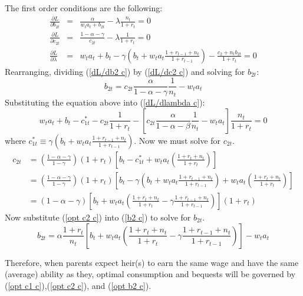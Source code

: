 \documentclass{article}
\begin{document}
The first order conditions are the following:
\begin{eqnarray}
\frac{\partial L}{\partial b_{2t}} &=& \frac{\alpha}{w_t a_t + b_{2t}} - \lambda \frac{n_t}{1+r_t} = 0\label{dL/db2 c}\\
\frac{\partial L}{\partial c_{2t}} &=& \frac{1-\alpha-\gamma}{c_{2t}}-\lambda\frac{1}{1+r_t} = 0\label{dL/dc2 c}\\
\frac{\partial L}{\partial \lambda} &=& w_t a_t + b_t - \gamma(b_t+w_t a_t \frac{1+r_{t-1}+n_t}{1+r_{t-1}} ) - \frac{c_{2} + n_t b_{2t}}{1+r_t} = 0\label{dL/dlambda c}
\end{eqnarray}
Rearranging, dividing (\ref{dL/db2 c}) by (\ref{dL/dc2 c}) and solving for $b_{2t}$:
\begin{equation}\label{b2 c}
b_{2t} = c_{2t}\frac{\alpha}{1-\alpha-\gamma}\frac{1}{n_t}-w_t a_t
\end{equation}
Substituting the equation above into (\ref{dL/dlambda c}):
\begin{equation}
w_t a_t + b_t - c^{*}_{1t} - c_{2t}\frac{1}{1+r_t} - [c_{2t}\frac{\alpha}{1-\alpha-\beta}\frac{1}{n_t}-w_t a_t]\frac{n_t}{1+r_t} = 0
\end{equation}
where $c^{*}_{1t} \equiv \gamma(b_t + w_t a_t\frac{1+r_{t-1}+n_t}{1+r_{t-1}} )$.  Now we must solve for $c_{2t}$.
\begin{equation}\label{opt c2 c}
\begin{split}
c_{2t}
&= (\frac{1-\alpha-\gamma}{1-\gamma})(1+r_t)[ b_t-c^{*}_{1t} + w_t a_t (\frac{1+r_t+n_t}{1+r_t}) ]\\
&= (\frac{1-\alpha-\gamma}{1-\gamma})(1+r_t)[ b_t-\gamma(b_t + w_t a_t\frac{1+r_{t-1}+n_t}{1+r_{t-1}} ) + w_t a_t (\frac{1+r_t+n_t}{1+r_t}) ]\\
&= (1-\alpha-\gamma)[b_t + w_t a_t (\frac{1+r_t+n_t}{1+r_t}-\gamma \frac{1+r_{t-1}+n_t}{1+r_{t-1}})](1+r_t)
\end{split}
\end{equation}
Now substitute (\ref{opt c2 c}) into (\ref{b2 c}) to solve for $b_{2t}$.
\begin{equation}\label{opt b2 c}
b_{2t} = \alpha\frac{1+r_t}{n_t}[b_t + w_t a_t (\frac{1+r_t+n_t}{1+r_t}-\gamma \frac{1+r_{t-1}+n_t}{1+r_{t-1}})] - w_t a_t
\end{equation}

Therefore, when parents expect heir(s) to earn the same wage and have the same (average) ability as they, optimal consumption and bequests will be governed by (\ref{opt c1 c}),(\ref{opt c2 c}), and (\ref{opt b2 c}).
\end{document}
